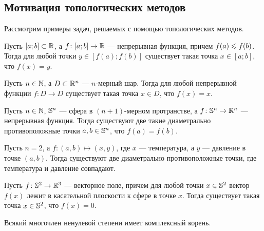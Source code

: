 \documentclass[main]{subfiles}
\begin{document}

\section{}

\subsection{Мотивация топологических методов}

Рассмотрим примеры задач, решаемых с помощью топологических методов.

\begin{theorem*}
	Пусть $ [a; b] \subset \R $, а $ f \colon [a; b] \to \R $ --- непрерывная функция,
	причем $ f(a) \Le f(b) $. Тогда для любой точки $ y \in [f(a); f(b)] $ существует такая точка
	$ x \in [a; b] $, что $ f(x) = y $.
\end{theorem*}


\begin{theorem*}[Бр\'{а}уэра]
	Пусть $ n \in \N $, а $ D \subset \R^n $ --- $ n $-мерный шар. Тогда для любой
	непрерывной функции $ f \colon D \to D $ существует такая точка $ x \in D $, что $ f(x) = x $.
\end{theorem*}


\begin{theorem*}
	Пусть $ n \in \N $, $ \S^n $ --- сфера в $ (n + 1) $-мерном протранстве,
	а $ f \colon \S^n \to \R^n $ --- непрерывная функция. Тогда существуют две такие
	диаметрально противоположные точки $ a, b \in \S^n $, что $ f(a) = f(b) $.
\end{theorem*}

\begin{example}
	Пусть $ n = 2 $, а $ f \colon (a, b) \mapsto (x, y) $, где $ x $ --- температура,
	а $ y $ --- давление в точке $ (a, b) $. Тогда существуют две диаметрально противоположные точки,
	где температура и давление совпадают.
\end{example}

\begin{theorem*}
	Пусть $ f \colon \S^2 \to \R^3 $ --- векторное поле, причем для любой
	точки $ x \in \S^2 $ вектор $ f(x) $ лежит в касательной плоскости к сфере в точке $ x $.
	Тогда существует такая точка $ x \in \S^2 $, что $ f(x) = 0 $.
\end{theorem*}

\begin{theorem*}
	Всякий многочлен ненулевой степени имеет комплексный корень.
\end{theorem*}
\end{document}
